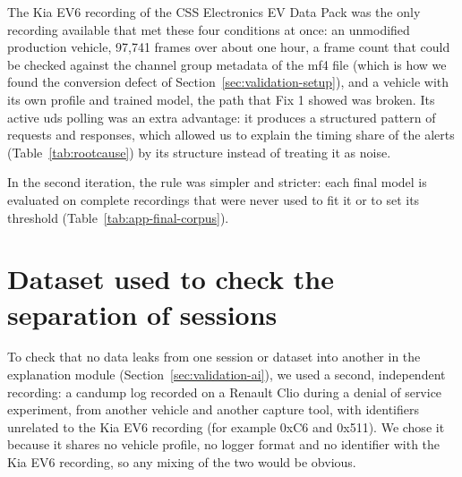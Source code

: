 The Kia EV6 recording of the CSS Electronics EV Data Pack was the only recording available that met these four conditions at once: an unmodified production vehicle, 97{,}741 frames over about one hour, a frame count that could be checked against the channel group metadata of the \gls{mf4} file (which is how we found the conversion defect of Section~\ref{sec:validation-setup}), and a vehicle with its own profile and trained model, the path that Fix 1 showed was broken. Its active \gls{uds} polling was an extra advantage: it produces a structured pattern of requests and responses, which allowed us to explain the timing share of the alerts (Table~\ref{tab:rootcause}) by its structure instead of treating it as noise.

In the second iteration, the rule was simpler and stricter: each final model is evaluated on complete recordings that were never used to fit it or to set its threshold (Table~\ref{tab:app-final-corpus}).

\section{Dataset used to check the separation of sessions}

To check that no data leaks from one session or dataset into another in the explanation module (Section~\ref{sec:validation-ai}), we used a second, independent recording: a candump log recorded on a Renault Clio during a denial of service experiment, from another vehicle and another capture tool, with identifiers unrelated to the Kia EV6 recording (for example 0xC6 and 0x511). We chose it because it shares no vehicle profile, no logger format and no identifier with the Kia EV6 recording, so any mixing of the two would be obvious.
